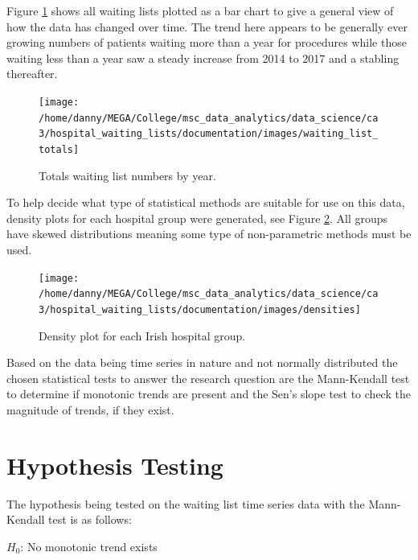 \documentclass[
  12pt,
]{article}
\begin{document}
\label{sec:stats-methods}
Figure \ref{fig:totals-img} shows all waiting lists plotted as a bar chart to give a general view of how the data has changed over time. The trend here appears to be generally ever growing numbers of patients waiting more than a year for procedures while those waiting less than a year saw a steady increase from 2014 to 2017 and a stabling thereafter.

\begin{figure}[h]

{\centering \texttt{[image: /home/danny/MEGA/College/msc\_data\_analytics/data\_science/ca3/hospital\_waiting\_lists/documentation/images/waiting\_list\_totals]} 

}

\caption{Totals waiting list numbers by year.}\label{fig:totals-img}
\end{figure}

To help decide what type of statistical methods are suitable for use on this data, density plots for each hospital group were generated, see Figure \ref{fig:densities-img}. All groups have skewed distributions meaning some type of non-parametric methods must be used.

\begin{figure}

{\centering \texttt{[image: /home/danny/MEGA/College/msc\_data\_analytics/data\_science/ca3/hospital\_waiting\_lists/documentation/images/densities]} 

}

\caption{Density plot for each Irish hospital group.}\label{fig:densities-img}
\end{figure}

Based on the data being time series in nature and not normally distributed the chosen statistical tests to answer the research question are the Mann-Kendall test to determine if monotonic trends are present and the Sen's slope test to check the magnitude of trends, if they exist.

\newpage

\hypertarget{hypothesis-testing}{%
\section{Hypothesis Testing}\label{hypothesis-testing}}

The hypothesis being tested on the waiting list time series data with the Mann-Kendall test is as follows:

\(H_0\): No monotonic trend exists
\end{document}
